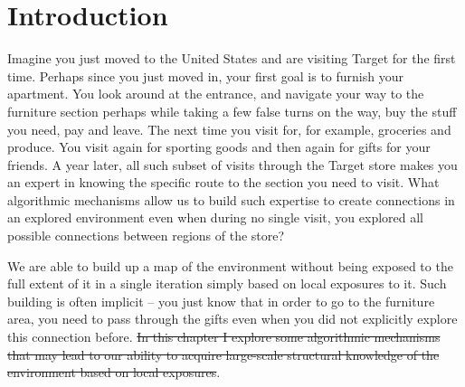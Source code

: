 \section{Introduction}

Imagine you just moved to the United States and are visiting Target for the first time. Perhaps since you just moved in, your first goal is to furnish your apartment. You look around at the entrance, and navigate your way to the furniture section perhaps while taking a few false turns on the way, buy the stuff you need, pay and leave. The next time you visit for, for example, groceries and produce. You visit again for sporting goods and then again for gifts for your friends. A year later, all such subset of visits through the Target store makes you an expert in knowing the specific route to the section you need to visit. What algorithmic mechanisms allow us to build such expertise to create connections in an explored environment even when during no single visit, you explored all possible connections between regions of the store?

We are able to build up a map of the environment without being exposed to the full extent of it in a single iteration simply based on local exposures to it. Such building is often implicit -- you just know that in order to go to the furniture area, you need to pass through the gifts even when you did not explicitly explore this connection before. \st{In this chapter I explore some algorithmic mechanisms that may lead to our ability to acquire large-scale structural knowledge of the environment based on local exposures}. 

